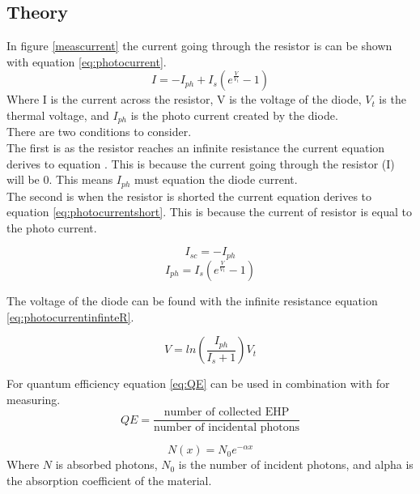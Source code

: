 \documentclass[10pt,a4paper]{article}
\begin{document}
\begin{multicols}{2}
\section*{Theory}

In figure \ref{meascurrent} the current going through the resistor is can be shown with equation \ref{eq:photocurrent}.\\

\begin{equation}\label{eq:photocurrent}
I = -I_{ph} + I_s (e^{\frac{V}{V_t}}-1)
\end{equation}
Where I is the current across the resistor, V is the voltage of the diode, $V_t$ is the thermal voltage, and $I_{ph}$ is the photo current created by the diode.\\
There are two conditions to consider.\\
The first is as the resistor reaches an infinite resistance the current equation derives to equation . This is because the current going through the resistor (I) will be 0. This means $I_{ph}$ must equation the diode current.\\
The second is when the resistor is shorted the current equation derives to equation \ref{eq:photocurrentshort}. This is because the current of resistor is equal to the photo current.

\begin{equation}\label{eq:photocurrentshort}
I_{sc} = -I_{ph}
\end{equation}
\begin{equation}\label{eq:photocurrentinfinteR}
I_{ph} = I_s (e^{\frac{V}{V_t}}-1)
\end{equation}

The voltage of the diode can be found with the infinite resistance equation \ref{eq:photocurrentinfinteR}.

\begin{equation}\label{eq:photovoltageinfinteR}
V = ln(\frac{I_{ph}}{I_s+1}) V_t
\end{equation}

For quantum efficiency equation \ref{eq:QE} can be used  in combination with for measuring.\\
\begin{equation}\label{eq:QE}
QE = \frac{\textrm{number of collected EHP}}{\textrm{number of incidental photons}}
\end{equation}

\begin{equation}\label{eq:N0}
N(x) = N_0 e^{-\alpha x}
\end{equation}
Where $N$ is absorbed photons, $N_0$ is the number of incident photons, and alpha is the absorption coefficient of the material.


\end{multicols}
\end{document}
